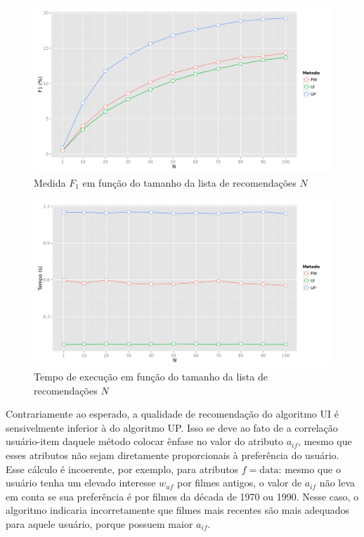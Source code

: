 \begin{figure}[htp]
    \begin{center}
    \includegraphics[width=1\textwidth]{img/F1_N}
    \end{center}
    \label{fig:F1_N}
    \caption{Medida $F_1$ em função do tamanho da lista de recomendações $N$}
\end{figure}

\begin{figure}[htp]
    \begin{center}
    \includegraphics[width=1\textwidth]{img/time_N}
    \end{center}
    \label{fig:time_N}
    \caption{Tempo de execução em função do tamanho da lista de recomendações $N$}
\end{figure}

Contrariamente ao esperado, a qualidade de recomendação do algoritmo UI é sensivelmente inferior à do algoritmo UP. Isso se deve ao fato de a correlação usuário-item daquele método colocar ênfase no valor do atributo $a_{if}$, mesmo que esses atributos não sejam diretamente proporcionais à preferência do usuário. Esse cálculo é incoerente, por exemplo, para atributos $f=\mathrm{data}$: mesmo que o usuário tenha um elevado interesse $w_{uf}$ por filmes antigos, o valor de $a_{if}$ não leva em conta se sua preferência é por filmes da década de 1970 ou 1990. Nesse caso, o algoritmo indicaria incorretamente que filmes mais recentes são mais adequados para aquele usuário, porque possuem maior $a_{if}$.

